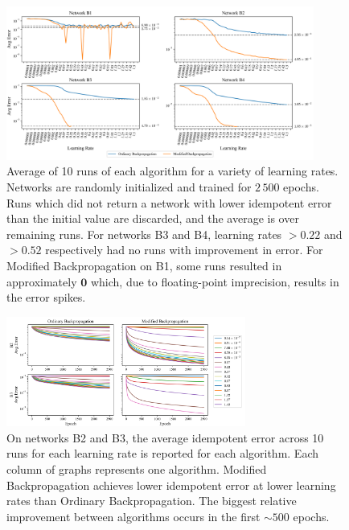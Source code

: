 \documentclass{article}
\theoremstyle{plain}
\theoremstyle{definition}
\theoremstyle{remark}
\begin{document}
\begin{figure}[htbp]
    \centering
    \includegraphics[width=0.9\textwidth]{./resources/abs_err_b1234.png}
    \caption{Average of 10 runs of each algorithm for a variety of learning rates. Networks are randomly initialized and trained for $2\,500$ epochs. Runs which did not return a network with lower idempotent error than the initial value are discarded, and the average is over remaining runs. For networks B3 and B4, learning rates $>0.22$ and $>0.52$ respectively had no runs with improvement in error. For Modified Backpropagation on B1, some runs resulted in approximately $\bm{0}$ which, due to floating-point imprecision, results in the error spikes.}
    \label{fig:avg-abs-err}
\end{figure}
%
\begin{figure}[htbp]
    \centering
    \includegraphics[width=0.7\textwidth]{./resources/runs_err_b23.png}
    \caption{On networks B2 and B3, the average idempotent error across 10 runs for each learning rate is reported for each algorithm. Each column of graphs represents one algorithm. Modified Backpropagation achieves lower idempotent error at lower learning rates than Ordinary Backpropagation. The biggest relative improvement between algorithms occurs in the first $\sim500$ epochs.}
    \label{fig:avg-epoch-err}
\end{figure}
\end{document}
